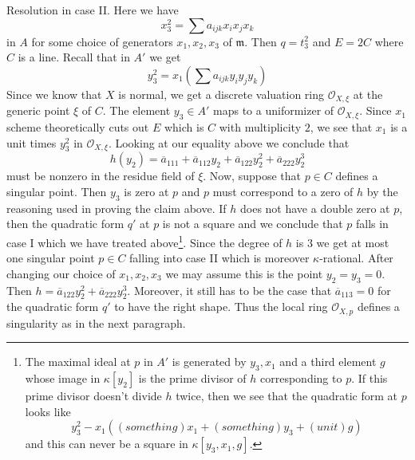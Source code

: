\medskip\noindent
Resolution in case II. Here we have
$$
x_3^2 = \sum a_{ijk}x_ix_jx_k
$$
in $A$ for some choice of generators $x_1, x_2, x_3$ of $\mathfrak m$.
Then $q = t_3^2$ and $E = 2C$ where $C$ is a line.
Recall that in $A'$ we get
$$
y_3^2 = x_1(\sum a_{ijk} y_iy_jy_k)
$$
Since we know that $X$ is normal, we get a discrete valuation
ring $\mathcal{O}_{X, \xi}$ at the generic point $\xi$ of $C$.
The element $y_3 \in A'$ maps to a uniformizer of $\mathcal{O}_{X, \xi}$.
Since $x_1$ scheme theoretically cuts out $E$
which is $C$ with multiplicity $2$, we see that
$x_1$ is a unit times $y_3^2$ in $\mathcal{O}_{X, \xi}$. Looking
at our equality above we conclude that
$$
h(y_2) = \overline{a}_{111} + \overline{a}_{112} y_2 +
\overline{a}_{122} y_2^2 +
\overline{a}_{222} y_2^3
$$
must be nonzero in the residue field of $\xi$.
Now, suppose that $p \in C$ defines a singular point.
Then $y_3$ is zero at $p$ and $p$ must correspond to a
zero of $h$ by the reasoning used in proving the claim above.
If $h$ does not have a double zero at $p$, then the quadratic
form $q'$ at $p$ is not a square and we conclude that $p$
falls in case I which we have treated above\footnote{The maximal
ideal at $p$ in $A'$ is generated by $y_3, x_1$ and a third element
$g$ whose image in $\kappa[y_2]$ is the prime divisor of $h$
corresponding to $p$. If this prime divisor doesn't divide $h$
twice, then we see that the quadratic form at $p$ looks like
$$
y_3^2 - x_1((something)x_1 + (something)y_3 + (unit)g)
$$
and this can never be a square in $\kappa[y_3, x_1, g]$.}.
Since the degree of $h$ is $3$ we
get at most one singular point $p \in C$ falling into case II
which is moreover $\kappa$-rational. After changing our
choice of $x_1, x_2, x_3$ we may assume this is the point
$y_2 = y_3 = 0$.
Then $h = \overline{a}_{122} y_2^2 + \overline{a}_{222} y_2^3$.
Moreover, it still has to be the case that
$\overline{a}_{113} = 0$ for the quadratic form $q'$ to have
the right shape.
Thus the local ring $\mathcal{O}_{X, p}$ defines a singularity
as in the next paragraph.

